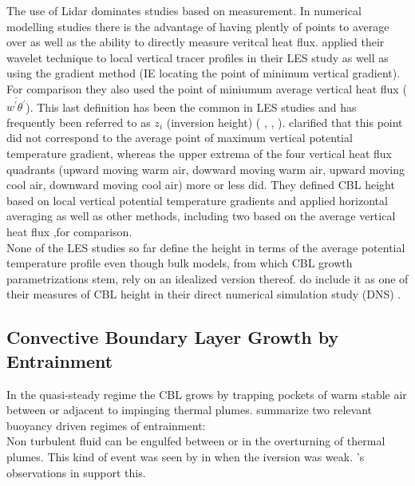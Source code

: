 The use of Lidar dominates studies based on measurement. In numerical modelling studies there
is the advantage of having plently of points to average over as well as the ability to directly
measure veritcal heat flux. \citeauthor{BrooksFowler2} \cite{BrooksFowler2}
applied their wavelet technique to local vertical tracer profiles in their \acs{LES} study as well as using the
gradient method (IE locating the point of minimum vertical gradient).  For comparison they also used the point of 
miniumum average vertical heat flux ($\overline{w^{'}\theta^{'}}$).  This last definition has been the common
in \acs{LES} studies and has frequently been referred to as $z_{i}$ (inversion height) (\citeauthor{DearWill80} 
\cite{DearWill80}, \citeauthor{Sorbjan1} \cite{Sorbjan1}, \citeauthor{FedConzMir04} \cite{FedConzMir04}).
 \citeauthor{SullMoengStev} \cite{SullMoengStev} clarified that this point did not correspond to the
average point of maximum vertical potential temperature gradient, whereas the upper extrema of the four vertical
heat flux quadrants (upward moving warm air, dowward moving warm air, upward moving cool air, downward moving
cool air) more or less did. They defined \acs{CBL} height based on local vertical potential temperature gradients
and applied horizontal averaging as well as other methods, including two based on the average vertical heat flux
,for comparison.\\

None of the \acs{LES} studies so far define the height in terms of the average potential temperature profile
even though bulk models, from which \acs{CBL} growth parametrizations stem, rely on an idealized version thereof.
\citeauthor{GarciaMellado} do include it as one of their measures of \acs{CBL} height in their direct numerical
simulation study (\acs{DNS}) \cite{GarciaMellado}.       

\subsection{Convective Boundary Layer Growth by Entrainment}
\label{subsec:}

In the quasi-steady regime the \acs{CBL} grows by trapping pockets of warm stable air between
or adjacent to impinging thermal plumes.  \citeauthor{Traum11} \cite{Traum11} summarize two
relevant buoyancy driven regimes of entrainment:\\

Non turbulent fluid can be engulfed between or in the overturning of thermal plumes. This kind of
event was seen by \citeauthor{SullMoengStev} in \cite{SullMoengStev} when the iversion was weak. 
\citeauthor{Traum11}'s observations in \cite{Traum11} support this.\\

